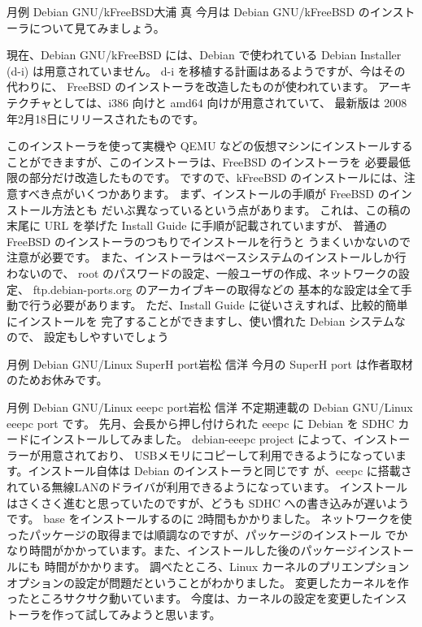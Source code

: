 \documentclass[mingoth,a4paper]{jsarticle}
\begin{document}
\begin{getsureiupdate}{月例 Debian GNU/kFreeBSD}{大浦 真}
今月は Debian GNU/kFreeBSD のインストーラについて見てみましょう。

現在、Debian GNU/kFreeBSD には、Debian で使われている
Debian Installer (d-i) は用意されていません。
d-i を移植する計画はあるようですが、今はその代わりに、
FreeBSD のインストーラを改造したものが使われています。
アーキテクチャとしては、i386 向けと amd64 向けが用意されていて、
最新版は 2008年2月18日にリリースされたものです。

このインストーラを使って実機や QEMU などの仮想マシンにインストールする
ことができますが、このインストーラは、FreeBSD のインストーラを
必要最低限の部分だけ改造したものです。
ですので、kFreeBSD のインストールには、注意すべき点がいくつかあります。
まず、インストールの手順が FreeBSD のインストール方法とも
だいぶ異なっているという点があります。
これは、この稿の末尾に URL を挙げた Install Guide に手順が記載されていますが、
普通の FreeBSD のインストーラのつもりでインストールを行うと
うまくいかないので注意が必要です。
また、インストーラはベースシステムのインストールしか行わないので、
root のパスワードの設定、一般ユーザの作成、ネットワークの設定、
ftp.debian-ports.org のアーカイブキーの取得などの
基本的な設定は全て手動で行う必要があります。
ただ、Install Guide に従いさえすれば、比較的簡単にインストールを
完了することができますし、使い慣れた Debian システムなので、
設定もしやすいでしょう
\end{getsureiupdate}

\begin{getsureiupdate}{月例 Debian GNU/Linux SuperH port}{岩松 信洋}
今月の SuperH port は作者取材のためお休みです。
\end{getsureiupdate}

\begin{getsureiupdate}{月例 Debian GNU/Linux eeepc port}{岩松 信洋}
不定期連載の Debian GNU/Linux eeepc port です。
先月、会長から押し付けられた eeepc に Debian を SDHC カードにインストールしてみました。
debian-eeepc project によって、インストーラーが用意されており、
USBメモリにコピーして利用できるようになっています。インストール自体は Debian のインストーラと同じです
が、eeepc に搭載されている無線LANのドライバが利用できるようになっています。
インストールはさくさく進むと思っていたのですが、どうも SDHC への書き込みが遅いようです。
base をインストールするのに 2時間もかかりました。
ネットワークを使ったパッケージの取得までは順調なのですが、パッケージのインストール
でかなり時間がかかっています。また、インストールした後のパッケージインストールにも
時間がかかります。
調べたところ、Linux カーネルのプリエンプションオプションの設定が問題だということがわかりました。
変更したカーネルを作ったところサクサク動いています。
今度は、カーネルの設定を変更したインストーラを作って試してみようと思います。
\end{getsureiupdate}
\end{document}
